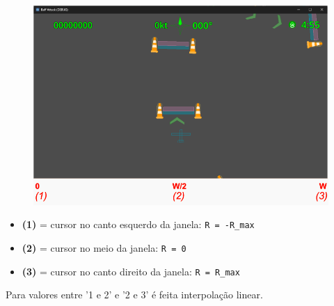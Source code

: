 \begin{figure}[h]
    \centering
    \includegraphics[width=\textwidth]{mouse-x.png}
\end{figure}

\begin{itemize}
\item \textbf{(1)} = cursor no canto esquerdo da janela: \texttt{R = -R\_max}
\item \textbf{(2)} = cursor no meio da janela: \texttt{R = 0}
\item \textbf{(3)} = cursor no canto direito da janela: \texttt{R = R\_max}
\end{itemize}

Para valores entre '1 e 2' e '2 e 3' é feita interpolação linear.
